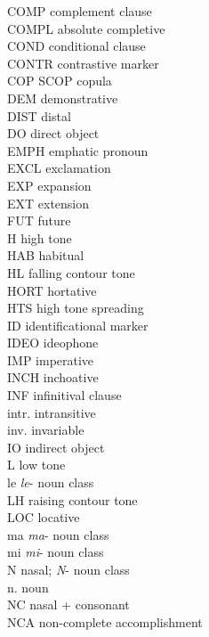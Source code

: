 \begin{multicols}{2}
COMP \hfill complement clause \\
COMPL \hfill absolute completive \\
COND \hfill conditional clause \\
CONTR \hfill contrastive marker \\
COP \hfill SCOP copula \\
DEM \hfill  demonstrative    \\
DIST \hfill  distal    \\
DO \hfill  direct object    \\
EMPH \hfill emphatic pronoun \\
EXCL \hfill exclamation \\
EXP \hfill expansion \\
EXT \hfill extension \\
FUT \hfill  future   \\
H  \hfill high tone    \\
HAB \hfill habitual \\
HL  \hfill falling contour tone    \\
HORT \hfill hortative \\
HTS \hfill high tone spreading \\
ID \hfill identificational marker \\
IDEO \hfill ideophone \\
IMP \hfill   imperative    \\
INCH \hfill  inchoative    \\
INF \hfill infinitival clause \\
intr. \hfill intransitive \\
inv. \hfill invariable \\
IO \hfill  indirect object    \\
L \hfill  low tone    \\
le \hfill {\it le}- noun class \\
LH \hfill  raising contour tone    \\
LOC \hfill  locative    \\
ma \hfill {\it ma}- noun class \\
mi \hfill {\it mi}- noun class \\
N  \hfill nasal; {\it N}- noun class \\
n.  \hfill noun   \\
NC \hfill nasal + consonant \\
NCA \hfill non-complete accomplishment \\

\end{multicols}
